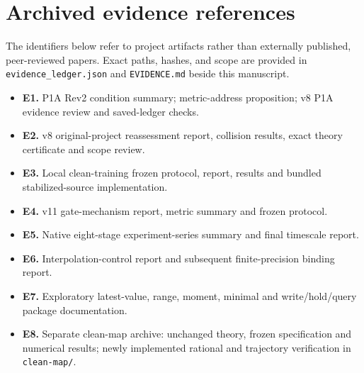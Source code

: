 \documentclass[
  10pt,
]{article}
\begin{document}
\section{Archived evidence
references}\label{archived-evidence-references}

The identifiers below refer to project artifacts rather than externally
published, peer-reviewed papers. Exact paths, hashes, and scope are
provided in \texttt{evidence\_ledger.json} and \texttt{EVIDENCE.md}
beside this manuscript.

\begin{itemize}
\item
  \textbf{E1.} P1A Rev2 condition summary; metric-address proposition;
  v8 P1A evidence review and saved-ledger checks.
\item
  \textbf{E2.} v8 original-project reassessment report, collision
  results, exact theory certificate and scope review.
\item
  \textbf{E3.} Local clean-training frozen protocol, report, results and
  bundled stabilized-source implementation.
\item
  \textbf{E4.} v11 gate-mechanism report, metric summary and frozen
  protocol.
\item
  \textbf{E5.} Native eight-stage experiment-series summary and final
  timescale report.
\item
  \textbf{E6.} Interpolation-control report and subsequent
  finite-precision binding report.
\item
  \textbf{E7.} Exploratory latest-value, range, moment, minimal and
  write/hold/query package documentation.
\item
  \textbf{E8.} Separate clean-map archive: unchanged theory, frozen
  specification and numerical results; newly implemented rational and
  trajectory verification in \texttt{clean-map/}.
\end{itemize}
\end{document}
